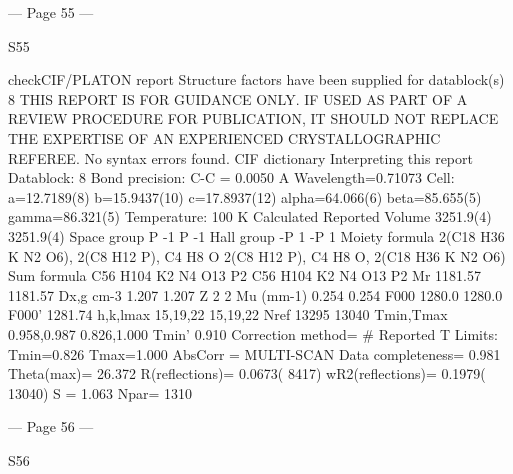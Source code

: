 --- Page 55 ---
 
 
S55 
 
 
 
checkCIF/PLATON report 
Structure factors have been supplied for datablock(s) 8
THIS REPORT IS FOR GUIDANCE ONLY. IF USED AS PART OF A REVIEW PROCEDURE
FOR PUBLICATION, IT SHOULD NOT REPLACE THE EXPERTISE OF AN EXPERIENCED
CRYSTALLOGRAPHIC REFEREE.
No syntax errors found.        CIF dictionary        Interpreting this report
Datablock: 8 
Bond precision:
C-C = 0.0050 A
Wavelength=0.71073
Cell:
a=12.7189(8)
b=15.9437(10)
c=17.8937(12)
alpha=64.066(6)
beta=85.655(5)
gamma=86.321(5)
Temperature: 
100 K
Calculated
Reported
Volume
3251.9(4)
3251.9(4)
Space group
P -1 
P -1 
Hall group
-P 1 
-P 1 
Moiety formula
2(C18 H36 K N2 O6), 2(C8
H12 P), C4 H8 O
2(C8 H12 P), C4 H8 O,
2(C18 H36 K N2 O6)
Sum formula
C56 H104 K2 N4 O13 P2
C56 H104 K2 N4 O13 P2
Mr
1181.57
1181.57
Dx,g cm-3
1.207
1.207
Z
2
2
Mu (mm-1)
0.254
0.254
F000
1280.0
1280.0
F000’
1281.74
h,k,lmax
15,19,22
15,19,22
Nref
13295 
13040 
Tmin,Tmax
0.958,0.987
0.826,1.000
Tmin’
0.910
Correction method= # Reported T Limits: Tmin=0.826 Tmax=1.000
AbsCorr = MULTI-SCAN
Data completeness= 0.981
Theta(max)= 26.372
R(reflections)= 0.0673( 8417)
wR2(reflections)= 0.1979( 13040)
S = 1.063
Npar= 1310


--- Page 56 ---
 
 
S56 
 
 
 
